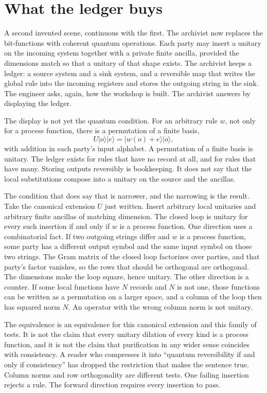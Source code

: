 \documentclass[11pt]{article}
\begin{document}
\section{What the ledger buys}
\label{sec:ledger}

A second invented scene, continuous with the first. The archivist now replaces the bit-functions with coherent quantum operations. Each party may insert a unitary on the incoming system together with a private finite ancilla, provided the dimensions match so that a unitary of that shape exists. The archivist keeps a ledger: a source system and a sink system, and a reversible map that writes the global rule into the incoming registers and stores the outgoing string in the sink. The engineer asks, again, how the workshop is built. The archivist answers by displaying the ledger.

The display is not yet the quantum condition. For an arbitrary rule \(w\), not only for a process function, there is a permutation of a finite basis,
\[
U\lvert o\rangle\lvert e\rangle = \lvert w(o)+e\rangle\lvert o\rangle,
\]
with addition in each party’s input alphabet. A permutation of a finite basis is unitary. The ledger exists for rules that have no record at all, and for rules that have many. Storing outputs reversibly is bookkeeping. It does not say that the local substitutions compose into a unitary on the source and the ancillas.

The condition that does say that is narrower, and the narrowing is the result. Take the canonical extension \(U\) just written. Insert arbitrary local unitaries and arbitrary finite ancillas of matching dimension. The closed loop is unitary for every such insertion if and only if \(w\) is a process function. One direction uses a combinatorial fact. If two outgoing strings differ and \(w\) is a process function, some party has a different output symbol and the same input symbol on those two strings. The Gram matrix of the closed loop factorizes over parties, and that party’s factor vanishes, so the rows that should be orthogonal are orthogonal. The dimensions make the loop square, hence unitary. The other direction is a counter. If some local functions have \(N\) records and \(N\) is not one, those functions can be written as a permutation on a larger space, and a column of the loop then has squared norm \(N\). An operator with the wrong column norm is not unitary.

The equivalence is an equivalence for this canonical extension and this family of tests. It is not the claim that every unitary dilation of every kind is a process function, and it is not the claim that purification in any wider sense coincides with consistency. A reader who compresses it into ``quantum reversibility if and only if consistency'' has dropped the restriction that makes the sentence true. Column norms and row orthogonality are different tests. One failing insertion rejects a rule. The forward direction requires every insertion to pass.
\end{document}
